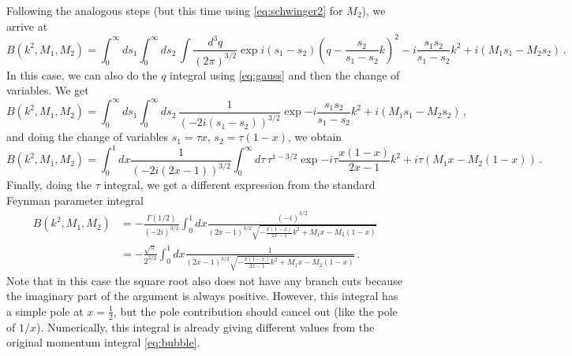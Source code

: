 \documentclass[twoside]{article}
\begin{document}
Following the analogous steps (but this time using \eqref{eq:schwinger2} for $M_2$), we arrive at
\begin{equation}
B(k^2,M_1,M_2)= \int_0^\infty ds_1 \int_0^\infty ds_2\,\int \frac{d^3q}{(2\pi)^{3/2}} \exp{i(s_1-s_2)(q- \frac{s_2}{s_1-s_2}k)^2-i\frac{s_1 s_2}{s_1-s_2}k^2+ i (M_1 s_1 -M_2 s_2)}\,.
\end{equation}
In this case, we can also do the $q$ integral using \eqref{eq:gauss} and then the change of variables. We get
\begin{equation}
B(k^2,M_1,M_2)= \int_0^\infty ds_1 \int_0^\infty ds_2\,\frac{1}{(-2 i(s_1-s_2))^{3/2}} \exp{-i\frac{s_1 s_2}{s_1-s_2}k^2+ i (M_1 s_1 -M_2 s_2)}\,,
\end{equation}
and doing the change of variables $s_1 = \tau x$, $s_2 = \tau (1-x)$, we obtain
\begin{equation}
B(k^2,M_1,M_2)=  \int_0^1 dx \frac{1}{(-2 i(2x-1))^{3/2}}\int_0^\infty d\tau\, \tau^{1-3/2}  \exp{-i \tau \frac{x (1-x)}{2x-1}k^2+ i \tau (M_1 x -M_2 (1-x))}\,.
\end{equation}
Finally, doing the $\tau$ integral, we get a different expression from the standard Feynman parameter integral
\begin{align}
B(k^2,M_1,M_2)&= -\frac{\Gamma(1/2)}{(-2 i)^{3/2}} \int_0^1 dx \frac{(-i)^{3/2}}{(2x-1)^{3/2}\sqrt{- \frac{x (1-x)}{2x-1}k^2+ M_1 x -M_2 (1-x)}}\\
& = -\frac{\sqrt{\pi}}{2^{3/2}} \int_0^1 dx \frac{1}{(2x-1)^{3/2}\sqrt{- \frac{x (1-x)}{2x-1}k^2+ M_1 x -M_2 (1-x)}} \,.
\end{align}
Note that in this case the square root also does not have any branch cuts because the imaginary part of the argument is always positive. However, this integral has a simple pole at $x=\frac12$, but the pole contribution should cancel out (like the pole of $1/x$).
Numerically, this integral is already giving different values from the original momentum integral \eqref{eq:bubble}.
\end{document}
